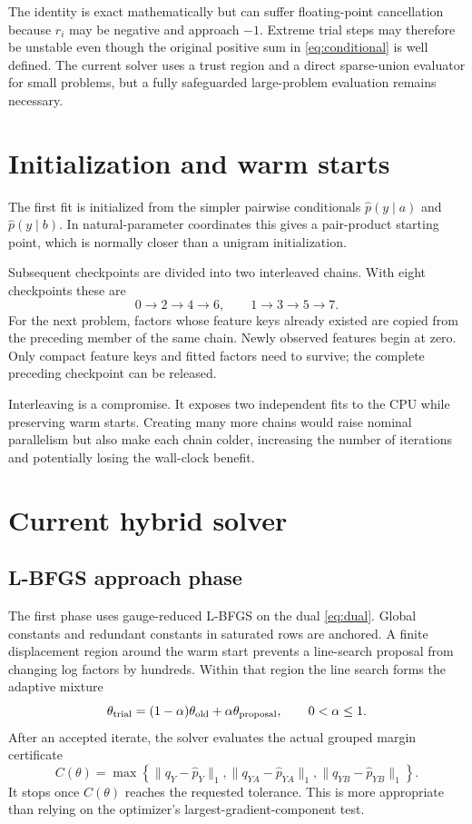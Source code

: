 \documentclass[11pt]{article}
\begin{document}
The identity is exact mathematically but can suffer floating-point
cancellation because $r_i$ may be negative and approach $-1$.  Extreme
trial steps may therefore be unstable even though the original positive
sum in \eqref{eq:conditional} is well defined.  The current solver uses a
trust region and a direct sparse-union evaluator for small problems, but a
fully safeguarded large-problem evaluation remains necessary.

\section{Initialization and warm starts}

The first fit is initialized from the simpler pairwise conditionals
$\widehat p(y\mid a)$ and $\widehat p(y\mid b)$.  In natural-parameter
coordinates this gives a pair-product starting point, which is normally
closer than a unigram initialization.

Subsequent checkpoints are divided into two interleaved chains.  With eight
checkpoints these are
\[
 0\longrightarrow2\longrightarrow4\longrightarrow6,
 \qquad
 1\longrightarrow3\longrightarrow5\longrightarrow7.
\]
For the next problem, factors whose feature keys already existed are copied
from the preceding member of the same chain.  Newly observed features begin
at zero.  Only compact feature keys and fitted factors need to survive; the
complete preceding checkpoint can be released.

Interleaving is a compromise.  It exposes two independent fits to the CPU
while preserving warm starts.  Creating many more chains would raise
nominal parallelism but also make each chain colder, increasing the number
of iterations and potentially losing the wall-clock benefit.

\section{Current hybrid solver}

\subsection{L-BFGS approach phase}

The first phase uses gauge-reduced L-BFGS on the dual
\eqref{eq:dual}.  Global constants and redundant constants in saturated
rows are anchored.  A finite displacement region around the warm start
prevents a line-search proposal from changing log factors by hundreds.
Within that region the line search forms the adaptive mixture
\[
 \theta_{\rm trial}
 =(1-\alpha)\theta_{\rm old}+\alpha\theta_{\rm proposal},
 \qquad 0<\alpha\leq1.
\]
After an accepted iterate, the solver evaluates the actual grouped margin
certificate
\[
 C(\theta)=\max\left\{
 \lVert q_Y-\widehat p_Y\rVert_1,
 \lVert q_{YA}-\widehat p_{YA}\rVert_1,
 \lVert q_{YB}-\widehat p_{YB}\rVert_1
 \right\}.
\]
It stops once $C(\theta)$ reaches the requested tolerance.  This is more
appropriate than relying on the optimizer's largest-gradient-component
test.
\end{document}
